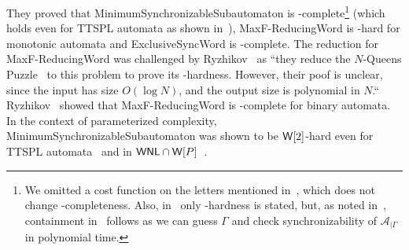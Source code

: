 They proved that {\sc MinimumSynchronizableSubautomaton}
is \NP-complete\footnote{We omitted a cost function on the letters 
	mentioned in~\cite{DBLP:journals/ijfcs/TurkerY15}, which does not change \NP-completeness.
Also, in~\cite{DBLP:journals/ijfcs/TurkerY15} only \NP-hardness is stated,
but, as  noted in~\cite{DBLP:journals/ita/BruchertseiferF21},
containment in \NP\  follows as we can guess $\Gamma$ and check synchronizability of $\mathcal A_{|\Gamma}$ in polynomial time.}
(which holds even for TTSPL automata as shown in~\cite[Cor.~5.9]{DBLP:journals/ita/BruchertseiferF21}), 
{\sc MaxF-ReducingWord} is \NP-hard
for monotonic automata and
{\sc ExclusiveSyncWord}
is \PSPACE-complete. The reduction for {\sc MaxF-ReducingWord}
was challenged by Ryzhikov~\cite[p.~80]{Ryzhikov19a} 
as ``they reduce the {\sc $N$-Queens Puzzle}~\cite{DBLP:journals/dm/BellS09} 
to this problem to prove its \NP-hardness. However, their poof
is unclear, since the input has size $O(\log N)$,
and the output size is polynomial in $N$.``
Ryzhikov~\cite[Prop.~3]{Ryzhikov19a} showed
that {\sc MaxF-ReducingWord} is \PSPACE-complete for binary automata.
In the context of parameterized complexity, 
{\sc MinimumSynchronizableSubautomaton}
was shown to be $\textup{\textsf{W}}[2]$-hard even for TTSPL automata~\cite[Cor.~5.7 \& 5.9]{DBLP:journals/ita/BruchertseiferF21} 
and in $\textsf{WNL} \cap \textup{\textsf{W}}[P]$~\cite[Thm.~12]{DBLP:journals/mscs/FernauB22}.

